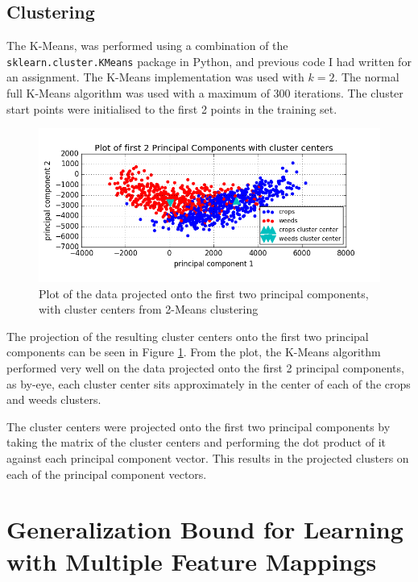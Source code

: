 \documentclass{scrartcl}
\begin{document}
\subsection{Clustering}

The K-Means, was performed using a combination of the \texttt{sklearn.cluster.KMeans} package in Python, and previous code I had written for an assignment. The K-Means implementation was used with $k = 2$. The normal full K-Means algorithm was used with a maximum of 300 iterations. The cluster start points were initialised to the first 2 points in the training set.\\

\begin{figure}[h]
\includegraphics[width=16cm]{2pc_cc.png}
\caption{Plot of the data projected onto the first two principal components, with cluster centers from 2-Means clustering}
\label{fig:2pc_cc}
\end{figure}

The projection of the resulting cluster centers onto the first two principal components can be seen in Figure \ref{fig:2pc_cc}. From the plot, the K-Means algorithm performed very well on the data projected onto the first 2 principal components, as by-eye, each cluster center sits approximately in the center of each of the crops and weeds clusters.

The cluster centers were projected onto the first two principal components by taking the matrix of the cluster centers and performing the dot product of it against each principal component vector. This results in the projected clusters on each of the principal component vectors.

\newpage
\section{Generalization Bound for Learning with Multiple Feature Mappings}

\subsection{}
\end{document}
